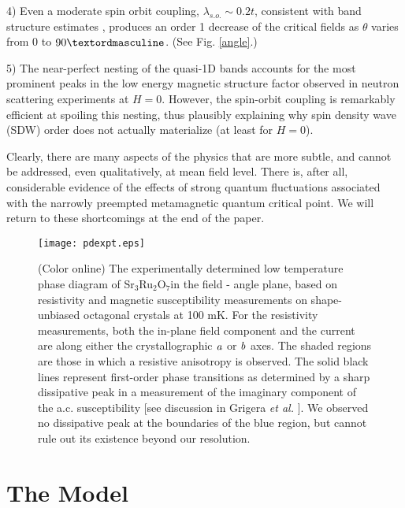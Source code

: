 \documentclass[prb,aps,amssymb,showpacs,twocolumn,amsmath,floatfix]{revtex4}
\def\SRO{Sr$_3$Ru$_2$O$_7$}
\begin{document}
   4)  Even a moderate spin orbit coupling, $\lambda_{s.o.} \sim 0.2 t$, consistent with band structure estimates
   \cite{Haverkort2008, Liu2008}, produces an order 1 decrease of the critical fields as $\theta$ varies from $0$ to $90 \textordmasculine$.  (See Fig. \ref{angle}.)
   
   5)  The near-perfect nesting of the quasi-1D bands accounts for the most prominent peaks in the low energy magnetic structure factor observed in neutron scattering experiments at $H=0$\cite{Capogna2003, Ramos2008}.  However, the spin-orbit coupling is remarkably efficient at spoiling this nesting, thus plausibly explaining why spin density wave (SDW) order does not actually materialize (at least for $H=0$)\cite{Capogna2003, Ramos2008}.

   
Clearly, there are many aspects of the physics that are more subtle, and cannot be addressed, even qualitatively, at mean field level.  There is, after all, considerable evidence of the effects of strong quantum fluctuations associated with the narrowly preempted metamagnetic quantum critical point.  We will return to these shortcomings at the end of the paper.





\begin{figure}[t]
\texttt{[image: pdexpt.eps]}
\caption{(Color online) The experimentally determined low temperature phase diagram of \SRO in the field - angle plane, based on resistivity and magnetic susceptibility measurements on shape-unbiased octagonal crystals at 100 mK.  For the resistivity measurements, both the in-plane field component and the current are along either the crystallographic ${\it a}$ or ${\it b}$ axes.  The shaded regions are those in which a resistive anisotropy is observed.  The solid black lines represent first-order phase transitions as determined by a sharp dissipative peak in a measurement of the imaginary component of the a.c. susceptibility [see discussion in Grigera {\it et al.} \cite{Grigera2003}].  We observed no dissipative peak at the boundaries of the blue region, but cannot rule out its existence beyond our resolution. }
\label{expt}
\end{figure} 

\section{The Model}
\label{model}
\end{document}
